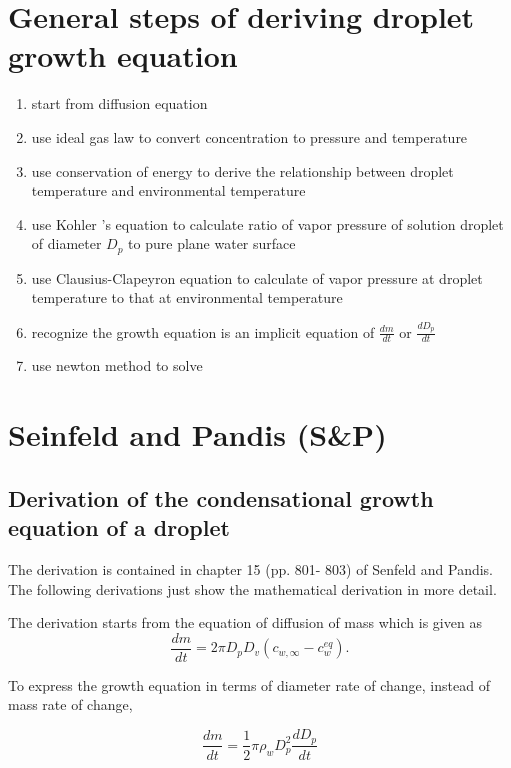 \documentclass[12pt]{amsart}
\begin{document}
\section{General steps of deriving droplet growth equation}

\begin{enumerate}
\item start from diffusion equation 
\item use ideal gas law to convert concentration to pressure and temperature
\item use conservation of energy to derive the relationship between droplet temperature and environmental temperature
\item use Kohler 's equation to calculate ratio of vapor pressure of solution droplet of diameter $D_{p}$ to pure plane water surface 
\item use Clausius-Clapeyron equation to calculate of vapor pressure at droplet temperature to that at environmental temperature
\item recognize the growth equation is an implicit equation of $\frac{dm}{dt}$ or $\frac{dD_{p}}{dt}$
\item use newton method to solve
 
\end{enumerate}
 
\section{Seinfeld and Pandis (S\&P) }

\subsection{Derivation of the condensational growth equation of a droplet}


The derivation is contained in chapter 15 (pp. 801- 803) of Senfeld and Pandis. The following derivations just show the mathematical derivation in more detail.

The derivation starts from the equation of diffusion of mass which is given as
\begin{equation}\label{eqn:1}
\frac{dm}{dt}=2 \pi D_{p} D_{v} (c_{w, \infty} - c_{w}^{eq}).  
\end{equation}

To express the growth equation in terms of diameter rate of change, instead of mass rate of change,

\begin{equation}\label{eqn:2}
\frac{dm}{dt}=\frac{1}{2} \pi \rho_{w} D_{p}^{2} \frac{dD_{p}}{dt}
\end{equation}
\end{document}
